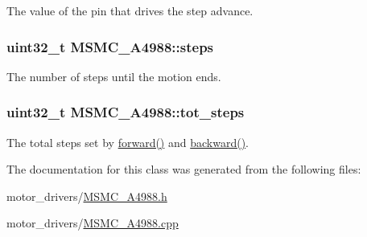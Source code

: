 The value of the pin that drives the step advance. 

\hypertarget{class_m_s_m_c___a4988_aa85fc95facc940db652cd2f545f033cd}{
\subsubsection[{steps}]{\setlength{\rightskip}{0pt plus 5cm}uint32\+\_\+t M\+S\+M\+C\+\_\+\+A4988\+::steps\hspace{0.3cm}{\ttfamily [private]}}}\label{class_m_s_m_c___a4988_aa85fc95facc940db652cd2f545f033cd}


The number of steps until the motion ends. 

\hypertarget{class_m_s_m_c___a4988_aa7de83eb15a9f82533b898146921939b}{
\subsubsection[{tot\+\_\+steps}]{\setlength{\rightskip}{0pt plus 5cm}uint32\+\_\+t M\+S\+M\+C\+\_\+\+A4988\+::tot\+\_\+steps\hspace{0.3cm}{\ttfamily [private]}}}\label{class_m_s_m_c___a4988_aa7de83eb15a9f82533b898146921939b}


The total steps set by \hyperlink{class_m_s_m_c___a4988_a9acdbabf546656a6436e89579e8fcfca}{forward()} and \hyperlink{class_m_s_m_c___a4988_a836bed9e28e723ead2a94446bb704869}{backward()}. 



The documentation for this class was generated from the following files\+:\begin{DoxyCompactItemize}
\item 
motor\+\_\+drivers/\hyperlink{_m_s_m_c___a4988_8h}{M\+S\+M\+C\+\_\+\+A4988.\+h}\item 
motor\+\_\+drivers/\hyperlink{_m_s_m_c___a4988_8cpp}{M\+S\+M\+C\+\_\+\+A4988.\+cpp}\end{DoxyCompactItemize}
